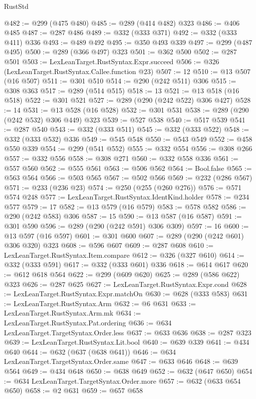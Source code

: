 \begin{lexlean}{RustStd}
\begin{coremodule}
@482 := @299 (@475 @480)
@485 := @289 (@414 @482) @323
@486 := @406 @485
@487 := @287 @486
@489 := @332 (@333 @371)
@492 := @332 (@333 @411) @336
@493 := @489 @492
@495 := @350 @493 @339
@497 := @299 (@487 @495)
@500 := @289 (@366 @497) @323
@501 := @362 @500
@502 := @287 @501
@503 := LexLeanTarget.RustSyntax.Expr.succeed
@506 := @326 (LexLeanTarget.RustSyntax.Callee.function @23)
@507 := 12
@510 := @13 @507 (@16 @507)
@511 := @301 @510
@514 := @290 (@242 @511) @306
@515 := @308 @363
@517 := @289 (@514 @515)
@518 := 13
@521 := @13 @518 (@16 @518)
@522 := @301 @521
@527 := @289 (@290 (@242 @522) @306 @427)
@528 := 14
@531 := @13 @528 (@16 @528)
@532 := @301 @531
@538 := @289 (@290 (@242 @532) @306 @449) @323
@539 := @527 @538
@540 := @517 @539
@541 := @287 @540
@543 := @332 (@333 @511)
@545 := @332 (@333 @522)
@548 := @332 (@333 @532) @336
@549 := @545 @548
@550 := @543 @549
@552 := @458 @550 @339
@554 := @299 (@541 @552)
@555 := @332 @554
@556 := @308 @266
@557 := @332 @556
@558 := @308 @271
@560 := @332 @558 @336
@561 := @557 @560
@562 := @555 @561
@563 := @506 @562
@564 := Bool.false
@565 := @563 @564
@566 := @503 @565
@567 := @502 @566
@569 := @232 (@286 @567)
@571 := @233 (@236 @23)
@574 := @250 (@255 (@260 @276))
@576 := @571 @574 @248
@577 := LexLeanTarget.RustSyntax.IdentKind.holder
@578 := @234 @577
@579 := 17
@582 := @13 @579 (@16 @579)
@583 := @578 @582
@586 := @290 (@242 @583) @306
@587 := 15
@590 := @13 @587 (@16 @587)
@591 := @301 @590
@596 := @289 (@290 (@242 @591) @306 @309)
@597 := 16
@600 := @13 @597 (@16 @597)
@601 := @301 @600
@607 := @289 (@290 (@242 @601) @306 @320) @323
@608 := @596 @607
@609 := @287 @608
@610 := LexLeanTarget.RustSyntax.Item.compare
@612 := @326 (@327 @610)
@614 := @332 (@333 @591)
@617 := @332 (@333 @601) @336
@618 := @614 @617
@620 := @612 @618 @564
@622 := @299 (@609 @620)
@625 := @289 (@586 @622) @323
@626 := @287 @625
@627 := LexLeanTarget.RustSyntax.Expr.cond
@628 := LexLeanTarget.RustSyntax.Expr.matchOn
@630 := @628 (@333 @583)
@631 := LexLeanTarget.RustSyntax.Arm
@632 := @6 @631
@633 := LexLeanTarget.RustSyntax.Arm.mk
@634 := LexLeanTarget.RustSyntax.Pat.ordering
@636 := @634 LexLeanTarget.TargetSyntax.Order.less
@637 := @633 @636
@638 := @287 @323
@639 := LexLeanTarget.RustSyntax.Lit.bool
@640 := @639 @339
@641 := @434 @640
@644 := @632 (@637 (@638 @641))
@646 := @634 LexLeanTarget.TargetSyntax.Order.same
@647 := @633 @646
@648 := @639 @564
@649 := @434 @648
@650 := @638 @649
@652 := @632 (@647 @650)
@654 := @634 LexLeanTarget.TargetSyntax.Order.more
@657 := @632 (@633 @654 @650)
@658 := @2 @631
@659 := @657 @658

\end{coremodule}
\end{lexlean}
